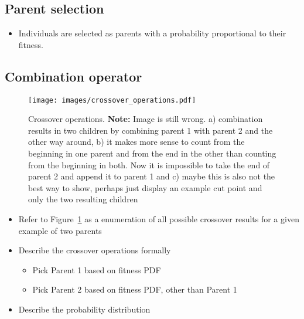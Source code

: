 \subsection{Parent selection}
\label{sec:approach_parent_selection}
\begin{itemize}
	\item Individuals are selected as parents with a probability proportional
		to their fitness.
\end{itemize}
\subsection{Combination operator}
\label{sec:approach_combination_operator}
\begin{figure}[ht!]
	\centering
	\texttt{[image: images/crossover\_operations.pdf]}
	\caption[Crossover operations]{Crossover operations. \textbf{Note:} Image
is still wrong. a) combination results in two children by combining parent 1
with parent 2 and the other way around, b) it makes more sense to count from
the beginning in one parent and from the end in the other than counting from
the beginning in both. Now it is impossible to take the end of parent 2 and
append it to parent 1 and c) maybe this is also not the best way to show,
perhaps just display an example cut point and only the two resulting children}
	\label{fig:crossover_operations}
\end{figure}
\begin{itemize}
	\item Refer to Figure~\ref{fig:crossover_operations} as a enumeration of
		all possible crossover results for a given example of two parents
	\item Describe the crossover operations formally
		\begin{itemize}
			\item Pick Parent 1 based on fitness PDF
			\item Pick Parent 2 based on fitness PDF, other than Parent 1
		\end{itemize}
	\item Describe the probability distribution
\end{itemize}
